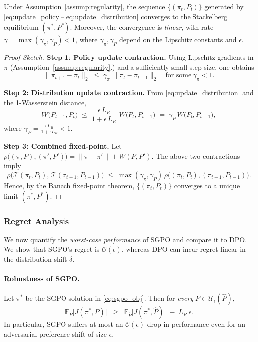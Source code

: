 \begin{theorem}
\label{thm:convergence_se}
Under Assumption~\ref{assump:regularity}, the sequence \(\{(\pi_t,P_t)\}\) generated by \eqref{eq:update_policy}--\eqref{eq:update_distribution} converges to the Stackelberg equilibrium \((\pi^*,P^*)\).  Moreover, the convergence is \emph{linear}, with rate \(\gamma=\max(\gamma_\pi,\gamma_P)<1\), where \(\gamma_\pi,\gamma_P\) depend on the Lipschitz constants and \(\epsilon\).
\end{theorem}

\begin{proof}[Proof Sketch]
\textbf{Step 1: Policy update contraction.}  
Using Lipschitz gradients in \(\pi\) (Assumption~\ref{assump:regularity}.) and a sufficiently small step size, one obtains
\[
\|\pi_{t+1}-\pi_t\|_2
\;\le\; \gamma_\pi\;\|\pi_t-\pi_{t-1}\|_2
\quad\text{for some}\;\gamma_\pi<1.
\]

\textbf{Step 2: Distribution update contraction.}  
From \eqref{eq:update_distribution} and the 1-Wasserstein distance,
\[
W\bigl(P_{t+1},P_t\bigr)
\;\le\;
\frac{\epsilon \,L_R}{1+\epsilon \,L_R}\;
W\bigl(P_t,P_{t-1}\bigr)
\;=\;\gamma_P\, W\bigl(P_t,P_{t-1}\bigr),
\]
where \(\gamma_P=\tfrac{\epsilon L_R}{1+\epsilon L_R}<1\).  

\textbf{Step 3: Combined fixed-point.}  
Let 
\(\rho\bigl((\pi,P),(\pi',P')\bigr)=\|\pi-\pi'\|+W(P,P')\).  The above two contractions imply
\[
\rho\bigl(\mathcal{T}(\pi_t,P_t),\,
\mathcal{T}(\pi_{t-1},P_{t-1})\bigr)
\;\le\;\max(\gamma_\pi,\gamma_P)\,\rho\bigl((\pi_t,P_t),(\pi_{t-1},P_{t-1})\bigr).
\]
Hence, by the Banach fixed-point theorem, \(\{(\pi_t,P_t)\}\) converges to a unique limit \((\pi^*,P^*)\).
\end{proof}

\subsubsection{Regret Analysis}

We now quantify the \emph{worst-case performance} of SGPO and compare it to DPO.  We show that SGPO’s regret is \(\mathcal{O}(\epsilon)\), whereas DPO can incur regret linear in the distribution shift \(\delta\).

\paragraph{Robustness of SGPO.}
\begin{theorem}
\label{thm:sgpo_regret_bound}
Let \(\pi^*\) be the SGPO solution in \eqref{eq:sgpo_obj}.  Then for \emph{every} \(P\in \mathcal{U}_\epsilon(\hat{P})\),
\[
\mathbb{E}_P\bigl[J(\pi^*,P)\bigr]
\;\;\ge\;\;
\mathbb{E}_{\hat{P}}\bigl[J(\pi^*,\hat{P})\bigr]
\;-\;L_R\,\epsilon.
\]
In particular, SGPO suffers at most an \(\mathcal{O}(\epsilon)\) drop in performance even for an adversarial preference shift of size \(\epsilon\).
\end{theorem}

